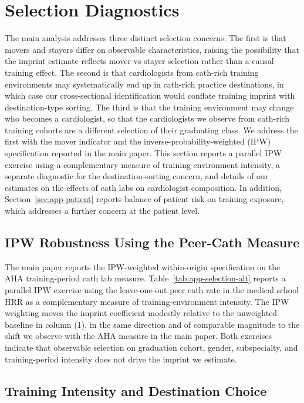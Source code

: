 \documentclass[12pt]{article}
\begin{document}
\section{Selection Diagnostics}\label{sec:app-ipw}

The main analysis addresses three distinct selection concerns. The first is that movers and stayers differ on observable characteristics, raising the possibility that the imprint estimate reflects mover-vs-stayer selection rather than a causal training effect. The second is that cardiologists from cath-rich training environments may systematically end up in cath-rich practice destinations, in which case our cross-sectional identification would conflate training imprint with destination-type sorting. The third is that the training environment may change who becomes a cardiologist, so that the cardiologists we observe from cath-rich training cohorts are a different selection of their graduating class. We address the first with the mover indicator and the inverse-probability-weighted (IPW) specification reported in the main paper. This section reports a parallel IPW exercise using a complementary measure of training-environment intensity, a separate diagnostic for the destination-sorting concern, and details of our estimates on the effects of cath labs on cardiologist composition. In addition, Section~\ref{sec:app-patient} reports balance of patient risk on training exposure, which addresses a further concern at the patient level.

\subsection{IPW Robustness Using the Peer-Cath Measure}

The main paper reports the IPW-weighted within-origin specification on the AHA training-period cath lab measure. Table~\ref{tab:app-selection-alt} reports a parallel IPW exercise using the leave-one-out peer cath rate in the medical school HRR as a complementary measure of training-environment intensity. The IPW weighting moves the imprint coefficient modestly relative to the unweighted baseline in column (1), in the same direction and of comparable magnitude to the shift we observe with the AHA measure in the main paper. Both exercises indicate that observable selection on graduation cohort, gender, subspecialty, and training-period intensity does not drive the imprint we estimate.

\subsection{Training Intensity and Destination Choice}\label{sec:app-train-dest}
\end{document}
